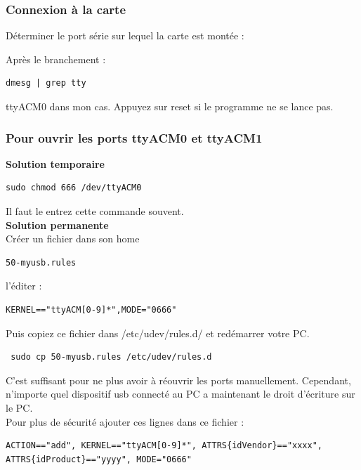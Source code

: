 \documentclass{article}
\begin{document}
\subsubsection{Connexion à la carte}

Déterminer le port série sur lequel la carte est montée :

Après le branchement : 

\begin{verbatim}
dmesg | grep tty 
\end{verbatim}

ttyACM0 dans mon cas. Appuyez sur reset si le programme ne se lance pas.



\subsubsection{Pour ouvrir les ports ttyACM0 et ttyACM1 }

\textbf{Solution temporaire} 


\begin{verbatim}
sudo chmod 666 /dev/ttyACM0
\end{verbatim}
Il faut le entrez cette commande souvent. \\
\textbf{Solution permanente}\\

Créer un fichier dans son home

\begin{verbatim}
50-myusb.rules
\end{verbatim} 

l'éditer : 

\begin{verbatim}
KERNEL=="ttyACM[0-9]*",MODE="0666"
\end{verbatim}

Puis copiez ce fichier dans /etc/udev/rules.d/ et redémarrer votre PC.

\begin{verbatim}
 sudo cp 50-myusb.rules /etc/udev/rules.d
\end{verbatim}
C'est suffisant pour ne plus avoir à réouvrir les ports manuellement. Cependant, n'importe quel dispositif usb connecté au PC a maintenant le droit d'écriture sur le PC. \\

Pour plus de sécurité ajouter ces lignes dans ce fichier :

\begin{verbatim}
ACTION=="add", KERNEL=="ttyACM[0-9]*", ATTRS{idVendor}=="xxxx", 
ATTRS{idProduct}=="yyyy", MODE="0666"
\end{verbatim}
 
\end{document}
